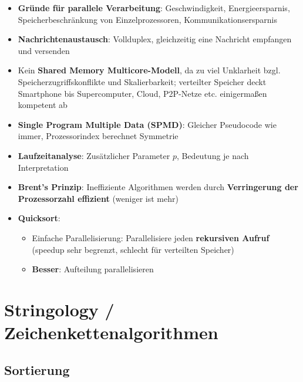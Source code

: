\documentclass[10pt,a4paper]{article}
\begin{document}
	\begin{itemize}
		\item \textbf{Gründe für parallele Verarbeitung}: Geschwindigkeit, Energieersparnis, Speicherbeschränkung von Einzelprozessoren, Kommunikationsersparnis
		\item \textbf{Nachrichtenaustausch}: Vollduplex, gleichzeitig eine Nachricht empfangen und versenden
		\item Kein \textbf{Shared Memory Multicore-Modell}, da zu viel Unklarheit bzgl. Speicherzugriffskonflikte und Skalierbarkeit; verteilter Speicher deckt Smartphone bis Supercomputer, Cloud, P2P-Netze etc. einigermaßen kompetent ab
		\item \textbf{Single Program Multiple Data (SPMD)}: Gleicher Pseudocode wie immer, Prozessorindex berechnet Symmetrie
		\item \textbf{Laufzeitanalyse}: Zusätzlicher Parameter $p$, Bedeutung je nach Interpretation
		\item \textbf{Brent's Prinzip}: Ineffiziente Algorithmen werden durch \textbf{Verringerung der Prozessorzahl effizient} (weniger ist mehr)
		\item \textbf{Quicksort}:
		\begin{itemize}
			\item Einfache Parallelisierung: Parallelisiere jeden \textbf{rekursiven Aufruf} (speedup sehr begrenzt, schlecht für verteilten Speicher)
			\item \textbf{Besser}: Aufteilung parallelisieren
		\end{itemize}
	\end{itemize}

	\newpage
	\section{Stringology / Zeichenkettenalgorithmen}
	\label{str:sec:stringology}
	
	\subsection{Sortierung}
	\label{str:sub:sortierung}
	
\end{document}
